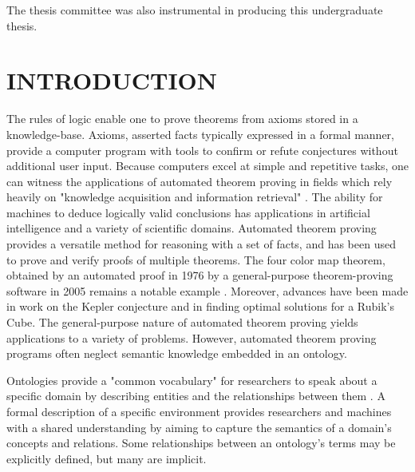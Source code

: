 \documentclass{article}
\begin{document}
The thesis committee was also instrumental in producing this undergraduate thesis.

\newpage
{}
\vspace*{.05in}
\listoffigures

\newpage
{}
\vspace*{.05in}
\listoftables

\newpage
{}
\tableofcontents

\newpage
{}
\setcounter{page}{1}
\vspace*{.05in}
\section{\MakeUppercase{Introduction}}

The rules of logic enable one to prove theorems from axioms stored in a knowledge-base. Axioms, asserted facts typically expressed in a formal manner, provide a computer program with tools to confirm or refute conjectures without additional user input. Because computers excel at simple and repetitive tasks, one can witness the applications of automated theorem proving in fields which rely heavily on "knowledge acquisition and information retrieval" \cite{sanchez2012ontology}. The ability for machines to deduce logically valid conclusions has applications in artificial intelligence and a variety of scientific domains. Automated theorem proving provides a versatile method for reasoning with a set of facts, and has been used to prove and verify proofs of multiple theorems. The four color map theorem, obtained by an automated proof in 1976 by a general-purpose theorem-proving software in 2005 remains a notable example \cite{gonthier2008formal}. Moreover, advances have been made in work on the Kepler conjecture and in finding optimal solutions for a Rubik's Cube. The general-purpose nature of automated theorem proving yields applications to a variety of problems. However, automated theorem proving programs often neglect semantic knowledge embedded in an ontology.

Ontologies provide a "common vocabulary" for researchers to speak about a specific domain by describing entities and the relationships between them \cite{noy2001ontology}. A formal description of a specific environment provides researchers and machines with a shared understanding by aiming to capture the semantics of a domain's concepts and relations. Some relationships between an ontology's terms may be explicitly defined, but many are implicit. 
\end{document}
